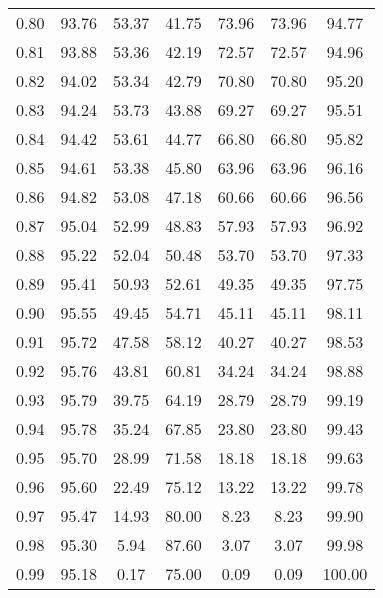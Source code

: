 \begin{tabular}{|c|c|c|c|c|c|c|}
      0.80 &     93.76 &     53.37 &      41.75 &   73.96 &      73.96 &         94.77 \\
      0.81 &     93.88 &     53.36 &      42.19 &   72.57 &      72.57 &         94.96 \\
      0.82 &     94.02 &     53.34 &      42.79 &   70.80 &      70.80 &         95.20 \\
      0.83 &     94.24 &     53.73 &      43.88 &   69.27 &      69.27 &         95.51 \\
      0.84 &     94.42 &     53.61 &      44.77 &   66.80 &      66.80 &         95.82 \\
      0.85 &     94.61 &     53.38 &      45.80 &   63.96 &      63.96 &         96.16 \\
      0.86 &     94.82 &     53.08 &      47.18 &   60.66 &      60.66 &         96.56 \\
      0.87 &     95.04 &     52.99 &      48.83 &   57.93 &      57.93 &         96.92 \\
      0.88 &     95.22 &     52.04 &      50.48 &   53.70 &      53.70 &         97.33 \\
      0.89 &     95.41 &     50.93 &      52.61 &   49.35 &      49.35 &         97.75 \\
      0.90 &     95.55 &     49.45 &      54.71 &   45.11 &      45.11 &         98.11 \\
      0.91 &     95.72 &     47.58 &      58.12 &   40.27 &      40.27 &         98.53 \\
      0.92 &     95.76 &     43.81 &      60.81 &   34.24 &      34.24 &         98.88 \\
      0.93 &     95.79 &     39.75 &      64.19 &   28.79 &      28.79 &         99.19 \\
      0.94 &     95.78 &     35.24 &      67.85 &   23.80 &      23.80 &         99.43 \\
      0.95 &     95.70 &     28.99 &      71.58 &   18.18 &      18.18 &         99.63 \\
      0.96 &     95.60 &     22.49 &      75.12 &   13.22 &      13.22 &         99.78 \\
      0.97 &     95.47 &     14.93 &      80.00 &    8.23 &       8.23 &         99.90 \\
      0.98 &     95.30 &      5.94 &      87.60 &    3.07 &       3.07 &         99.98 \\
      0.99 &     95.18 &      0.17 &      75.00 &    0.09 &       0.09 &        100.00 \\
\bottomrule
\end{tabular}
